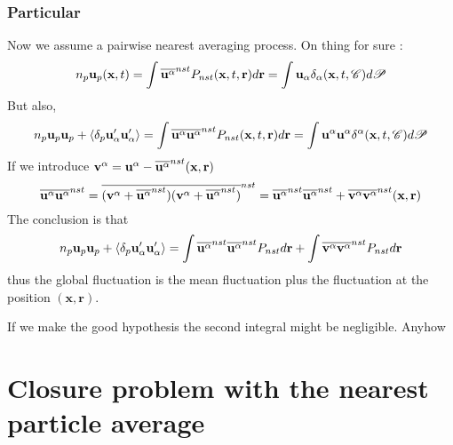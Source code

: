 \documentclass[12pt]{My_preprint}
\begin{document}
\subsubsection*{Particular}
Now we assume a pairwise nearest averaging process. 
On thing for sure : 
\begin{equation*}
    n_p \textbf{u}_p(\textbf{x},t)
    = \int \overline{ \textbf{u}^\alpha}^{nst}  P_{nst}(\textbf{x},t,\textbf{r}) d\textbf{r}
    = \int  \textbf{u}_\alpha \delta_\alpha (\textbf{x},t,\mathscr{C}) d\mathscr{P} 
\end{equation*}
But also, 
\begin{equation*}
    n_p \textbf{u}_p \textbf{u}_p
    + \left<\delta_p \textbf{u}_\alpha' \textbf{u}_\alpha'\right>
    =
    \int \overline{ \textbf{u}^\alpha\textbf{u}^\alpha}^{nst}  P_{nst}(\textbf{x},t,\textbf{r}) d\textbf{r}
    = \int  \textbf{u}^\alpha\textbf{u}^\alpha \delta^\alpha (\textbf{x},t,\mathscr{C}) d\mathscr{P} 
\end{equation*}
If we introduce $\textbf{v}^\alpha = \textbf{u}^\alpha - \overline{\textbf{u}^\alpha}^{nst}(\textbf{x},\textbf{r})$ 
\begin{equation*}
    \overline{ \textbf{u}^\alpha\textbf{u}^\alpha}^{nst}
    = \overline{ (\textbf{v}^\alpha + \overline{\textbf{u}^\alpha}^{nst})(\textbf{v}^\alpha + \overline{\textbf{u}^\alpha}^{nst})}^{nst}
    = \overline{ \textbf{u}^\alpha}^{nst}\overline{\textbf{u}^\alpha}^{nst} + \overline{ \textbf{v}^\alpha \textbf{v}^\alpha }^{nst}(\textbf{x},\textbf{r})
\end{equation*}
The conclusion is that 
\begin{align*}
    n_p \textbf{u}_p \textbf{u}_p
    + \left<\delta_p \textbf{u}_\alpha' \textbf{u}_\alpha'\right>
    =\int \overline{ \textbf{u}^\alpha}^{nst}\overline{\textbf{u}^\alpha}^{nst} P_{nst} d\textbf{r}
    + \int \overline{ \textbf{v}^\alpha \textbf{v}^\alpha }^{nst}  P_{nst} d\textbf{r}\\
\end{align*}
thus the global fluctuation is the mean fluctuation plus the fluctuation at the position $(\textbf{x},\textbf{r})$. 

If we make the  good hypothesis the second integral might be negligible. 
Anyhow 

\section{Closure problem with the nearest particle average}
\end{document}
